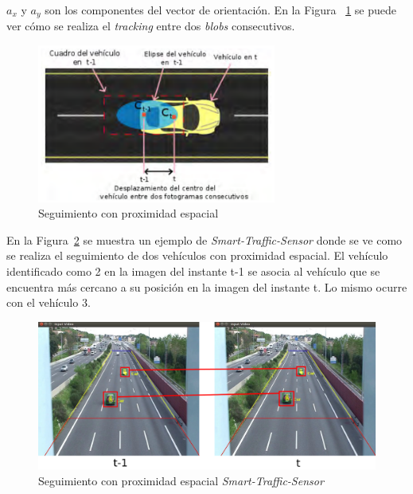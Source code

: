 $a_x$ y $a_y$ son los componentes del vector de orientación. En la Figura ~\ref{fig.emparejamiento_blob} se puede ver cómo se realiza el \textit{tracking} entre dos \textit{blobs} consecutivos. 

 \begin{figure}[H] 
\begin{center}
   \includegraphics[width=0.7\textwidth]{figures/Diseno_global/emparejamiento_blob.png}
   \caption{Seguimiento con proximidad espacial}
	\label{fig.emparejamiento_blob}
\end{center}
\end{figure}


En la Figura~\ref{fig.proximidad_espacial} se muestra un ejemplo de \textit{Smart-Traffic-Sensor} donde se ve como se realiza el seguimiento de dos vehículos con proximidad espacial. El vehículo identificado como 2 en la imagen del instante t-1 se asocia al vehículo que se encuentra más cercano a su posición en la imagen del instante t. Lo mismo ocurre con el vehículo 3.

 \begin{figure}[H] 
\begin{center}
   \includegraphics[scale=0.3]{figures/Diseno_global/proximidad_espacial.png}
   \caption{Seguimiento con proximidad espacial \textit{Smart-Traffic-Sensor}}
	\label{fig.proximidad_espacial}
\end{center}
\end{figure}

